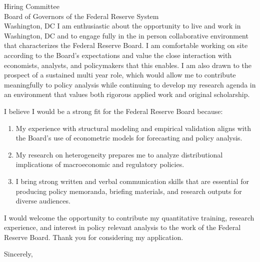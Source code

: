 \documentclass[11pt,letterpaper]{letter}
\begin{document}
\begin{letter}{Hiring Committee \\
Board of Governors of the Federal Reserve System \\
Washington, DC}
I am enthusiastic about the opportunity to live and work in Washington, DC and to engage fully in the in person collaborative environment that characterizes the Federal Reserve Board. I am comfortable working on site according to the Board’s expectations and value the close interaction with economists, analysts, and policymakers that this enables. I am also drawn to the prospect of a sustained multi year role, which would allow me to contribute meaningfully to policy analysis while continuing to develop my research agenda in an environment that values both rigorous applied work and original scholarship.

I believe I would be a strong fit for the Federal Reserve Board because:
\begin{enumerate}
    \item My experience with structural modeling and empirical validation aligns with the Board’s use of econometric models for forecasting and policy analysis.
    \item My research on heterogeneity prepares me to analyze distributional implications of macroeconomic and regulatory policies.
    \item I bring strong written and verbal communication skills that are essential for producing policy memoranda, briefing materials, and research outputs for diverse audiences.
\end{enumerate}

I would welcome the opportunity to contribute my quantitative training, research experience, and interest in policy relevant analysis to the work of the Federal Reserve Board. Thank you for considering my application.

\closing{Sincerely,}

\end{letter}
\end{document}
